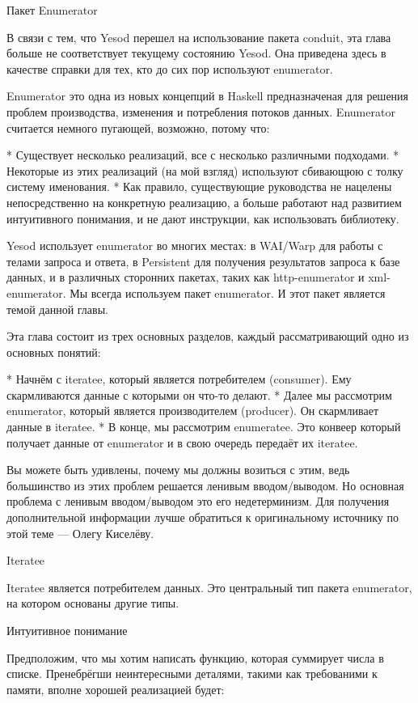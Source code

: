 Пакет Enumerator

В связи с тем, что Yesod перешел на использование пакета conduit, эта глава больше не соответствует текущему состоянию Yesod. Она приведена здесь в качестве справки для тех, кто до сих пор используют enumerator.

Enumerator это одна из новых концепций в Haskell предназначеная для решения проблем производства, изменения и потребления потоков данных. Enumerator считается немного пугающей, возможно, потому что:

* Существует несколько реализаций, все с несколько различными подходами.
* Некоторые из этих реализаций (на мой взгляд) используют сбивающюю с толку систему именования.
* Как правило, существующие руководства не нацелены непосредственно на конкретную реализацию, а больше работают над развитием интуитивного понимания, и не дают инструкции, как использовать библиотеку.

Yesod использует enumerator во многих местах: в WAI/Warp для работы с телами запроса и ответа, в Persistent для получения результатов запроса к базе данных, и в различных сторонних пакетах, таких как http-enumerator и xml-enumerator. Мы всегда используем пакет enumerator. И этот пакет является темой данной главы.

Эта глава состоит из трех основных разделов, каждый рассматривающий одно из основных понятий:

* Начнём с iteratee, который является потребителем (consumer). Ему скармливаются данные с которыми он что-то делают.
* Далее мы рассмотрим enumerator, который является производителем (producer). Он скармливает данные в iteratee.
* В конце, мы рассмотрим enumeratee. Это конвеер который получает данные от enumerator и в свою очередь передаёт их iteratee.

Вы можете быть удивлены, почему мы должны возиться с этим, ведь большинство из этих проблем решается ленивым вводом/выводом. Но основная проблема с ленивым вводом/выводом это его недетерминизм. Для получения дополнительной информации лучше обратиться к оригинальному источнику по этой теме --- Олегу Киселёву.

Iteratee

Iteratee является потребителем данных. Это центральный тип пакета enumerator, на котором основаны другие типы.

Интуитивное понимание

Предположим, что мы хотим написать функцию, которая суммирует числа в списке. Пренебрёгши неинтересными деталями, такими как требованими к памяти, вполне хорошей реализацией будет:

